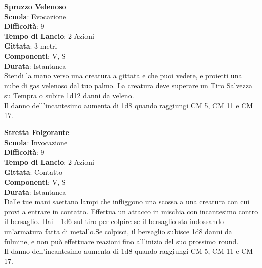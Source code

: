 \begin{multicols}{2}
\medskip\textbf{Spruzzo Velenoso}\\
\textbf{Scuola}: Evocazione\\
\textbf{Difficoltà}:  9\\
\textbf{Tempo di Lancio}: 2 Azioni\\
\textbf{Gittata}: 3 metri\\
\textbf{Componenti}: V, S\\
\textbf{Durata}: Istantanea\\
Stendi la mano verso una creatura a gittata e che puoi vedere, e proietti una nube di gas velenoso dal tuo palmo. La creatura deve superare un Tiro Salvezza su Tempra o subire 1d12 danni da veleno. \\
Il danno dell'incantesimo aumenta di 1d8 quando raggiungi CM 5, CM 11 e CM 17.

\medskip\textbf{Stretta Folgorante}\\
\textbf{Scuola}: Invocazione\\
\textbf{Difficoltà}:  9\\
\textbf{Tempo di Lancio}: 2 Azioni\\
\textbf{Gittata}: Contatto\\
\textbf{Componenti}: V, S\\
\textbf{Durata}: Istantanea\\
Dalle tue mani saettano lampi che infliggono una scossa a una creatura con cui provi a entrare in contatto. Effettua un attacco in mischia con incantesimo contro il bersaglio. Hai +1d6 sul tiro per colpire se il bersaglio sta indossando un'armatura fatta di metallo.Se colpisci, il  bersaglio subisce 1d8 danni da fulmine, e non può effettuare reazioni fino all'inizio del suo prossimo round.\\
Il danno dell'incantesimo aumenta di 1d8 quando raggiungi CM 5, CM 11 e CM 17.


\end{multicols}
